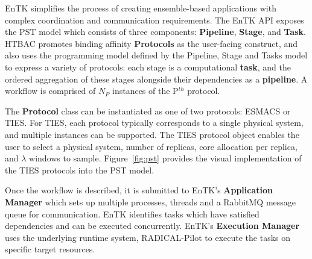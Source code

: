 
EnTK simplifies the process of creating ensemble-based applications with
complex coordination and communication requirements. The EnTK API exposes the
PST model which consists of three components: \textbf{Pipeline},
\textbf{Stage}, and \textbf{Task}. HTBAC promotes binding affinity  {\bf
Protocols} as the user-facing construct, and also uses the programming model
defined by the Pipeline, Stage and Tasks model to express a variety of
protocols: each stage is a computational \textbf{task}, and the
ordered aggregation of these stages alongside their dependencies as a
\textbf{pipeline}. A workflow is comprised of $N_P$ instances of the P$^{th}$
protocol.

The \textbf{Protocol} class can be instantiated as one of two protocols: ESMACS or TIES. For
TIES, each protocol typically corresponds to a single physical system, and
multiple instances can be supported. The TIES protocol object enables the user
to select a physical system, number of replicas, core allocation per replica,
and $\lambda$ windows to sample. Figure~\ref{fig:pst}
provides the visual implementation of the TIES protocols into the PST model.







Once the workflow is described, it is submitted to EnTK's
\textbf{Application Manager} which sets up multiple processes, threads and a
RabbitMQ message queue for communication.
EnTK identifies tasks which have satisfied dependencies and can be executed
concurrently. EnTK's \textbf{Execution Manager} uses the underlying runtime
system, RADICAL-Pilot to execute the tasks on specific target resources.

